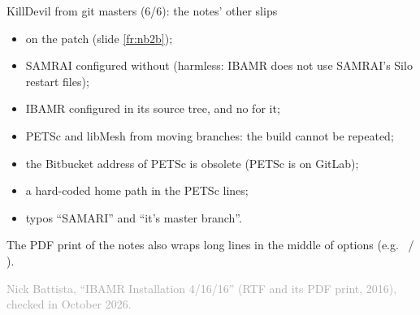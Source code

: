 \documentclass[aspectratio=169,11pt]{beamer}
\newcommand{\sourcecredit}[1]{\vfill\begin{flushright}\tiny\textcolor{DarkGray}{#1}\end{flushright}}
\begin{document}
\begin{frame}{KillDevil from git masters (6/6): the notes' other slips}
\label{fr:nbslips2}
\small
\begin{itemize}\setlength{\itemsep}{3pt}
  \item {} on the patch (slide \ref{fr:nb2b});
  \item SAMRAI configured without  (harmless: IBAMR does not use SAMRAI's Silo restart files);
  \item IBAMR configured in its source tree, and no  for it;
  \item PETSc and libMesh from moving  branches: the build cannot be repeated;
  \item the Bitbucket address of PETSc is obsolete (PETSc is on GitLab);
  \item a hard-coded home path in the PETSc  lines;
  \item typos ``SAMARI'' and ``it's master branch''.
\end{itemize}

\vspace{2mm}
The PDF print of the notes also wraps long lines in the middle of options (e.g.\  / ).
\sourcecredit{Nick Battista, ``IBAMR Installation 4/16/16'' (RTF and its PDF print, 2016), checked in October 2026.}
\end{frame}
\end{document}
